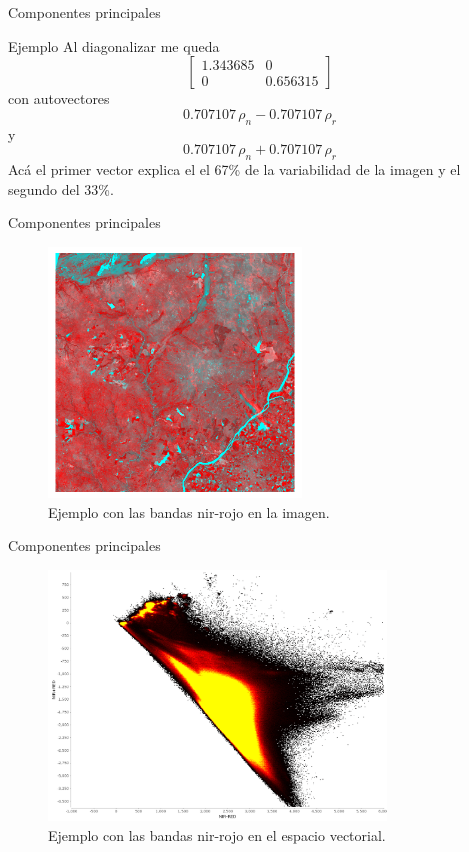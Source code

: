 \documentclass[]{beamer}
\begin{document}
\begin{frame}{Componentes principales}
  \begin{exampleblock}{Ejemplo}
    Al diagonalizar me queda
    \[
    \begin{bmatrix}
        1.343685       & 0 \\
        0       & 0.656315
    \end{bmatrix} \]
    con autovectores $$0.707107\, \rho_n-0.707107 \, \rho_r$$  y $$0.707107 \,
      \rho_n+0.707107\, \rho_r$$ \pause\@
    Acá el primer vector explica el el 67\% de la variabilidad de la imagen y el segundo del 33\%.
  \end{exampleblock}
\end{frame}

\begin{frame}{Componentes principales}
  \begin{figure}
  \centering
  \includegraphics[width=0.6\textwidth]{imagenes/pca1.png}
  \caption{Ejemplo con las bandas nir-rojo en la imagen.}
  \end{figure}
\end{frame}

\begin{frame}{Componentes principales}
  \begin{figure}
  \centering
  \includegraphics[width=0.8\textwidth]{imagenes/pca2.png}
  \caption{Ejemplo con las bandas nir-rojo en el espacio vectorial.}
  \end{figure}
\end{frame}
\end{document}
